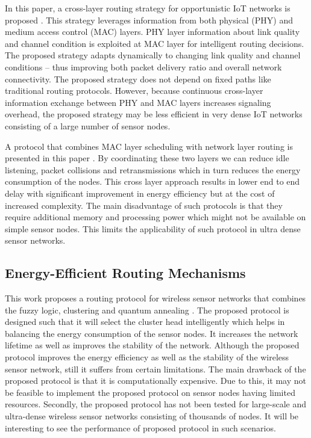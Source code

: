 \documentclass[a4paper,fleqn]{cas-dc}
\numberwithin{equation}{section}
\begin{document}
In this paper, a cross-layer routing strategy for opportunistic IoT networks is proposed \cite{Khalil2024}. This strategy leverages information from both physical (PHY) and medium access control (MAC) layers. PHY layer information about link quality and channel condition is exploited at MAC layer for intelligent routing decisions. The proposed strategy adapts dynamically to changing link quality and channel conditions – thus improving both packet delivery ratio and overall network connectivity. The proposed strategy does not depend on fixed paths like traditional routing protocols. However, because continuous cross-layer information exchange between PHY and MAC layers increases signaling overhead, the proposed strategy may be less efficient in very dense IoT networks consisting of a large number of sensor nodes.

A protocol that combines MAC layer scheduling with network layer routing is presented in this paper \cite{Kaddi20242611}. By coordinating these two layers we can reduce idle listening, packet collisions and retransmissions which in turn reduces the energy consumption of the nodes. This cross layer approach results in lower end to end delay with significant improvement in energy efficiency but at the cost of increased complexity. The main disadvantage of such protocols is that they require additional memory and processing power which might not be available on simple sensor nodes. This limits the applicability of such protocol in ultra dense sensor networks.

\subsection{Energy-Efficient Routing Mechanisms}

This work proposes a routing protocol for wireless sensor networks that combines the fuzzy logic, clustering and quantum annealing \cite{Wang2024}. The proposed protocol is designed such that it will select the cluster head intelligently which helps in balancing the energy consumption of the sensor nodes. It increases the network lifetime as well as improves the stability of the network. Although the proposed protocol improves the energy efficiency as well as the stability of the wireless sensor network, still it suffers from certain limitations. The main drawback of the proposed protocol is that it is computationally expensive. Due to this, it may not be feasible to implement the proposed protocol on sensor nodes having limited resources. Secondly, the proposed protocol has not been tested for large-scale and ultra-dense wireless sensor networks consisting of thousands of nodes. It will be interesting to see the performance of proposed protocol in such scenarios.
\end{document}
